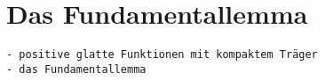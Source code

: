 %
%
%
\section{Das Fundamentallemma
\label{buch:variation:section:fundamentallemma}}

\begin{verbatim}
- positive glatte Funktionen mit kompaktem Träger
- das Fundamentallemma
\end{verbatim}
